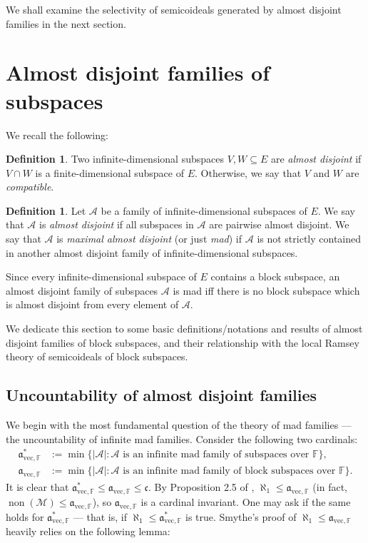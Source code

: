 \documentclass[10pt,a4paper]{amsart}
\theoremstyle{plain}
\numberwithin{equation}{section}
\theoremstyle{definition}
\newtheorem{definition}[theorem]{Definition}
\newcommand{\func}{\operatorname}
\newcommand{\cal}{\mathcal}
\renewcommand{\frak}{\mathfrak}
\newcommand{\A}{\cal{A}}
\newcommand{\non}{\func{non}}
\newcommand{\M}{\mathcal{M}}
\newcommand{\avec}{\frak{a}_{\mathrm{vec},\mathbb{F}}}
\begin{document}
We shall examine the selectivity of semicoideals generated by almost disjoint families in the next section.

\section{Almost disjoint families of subspaces}
\label{sec:ad.families}
We recall the following:
\begin{definition}
    Two infinite-dimensional subspaces $V,W \subseteq E$ are \emph{almost disjoint} if $V \cap W$ is a finite-dimensional subspace of $E$. Otherwise, we say that $V$ and $W$ are \emph{compatible}.
\end{definition}

\begin{definition}    
    Let $\A$ be a family of infinite-dimensional subspaces of $E$. We say that $\A$ is \emph{almost disjoint} if all subspaces in $\A$ are pairwise almost disjoint. We say that $\A$ is \emph{maximal almost disjoint} (or just \emph{mad}) if $\A$ is not strictly contained in another almost disjoint family of infinite-dimensional subspaces.
\end{definition}

Since every infinite-dimensional subspace of $E$ contains a block subspace, an almost disjoint family of subspaces $\A$ is mad iff there is no block subspace which is almost disjoint from every element of $\A$.

We dedicate this section to some basic definitions/notations and results of almost disjoint families of block subspaces, and their relationship with the local Ramsey theory of semicoideals of block subspaces.

\subsection{Uncountability of almost disjoint families}
We begin with the most fundamental question of the theory of mad families --- the uncountability of infinite mad families. Consider the following two cardinals:
\begin{align*}
    \avec^* &:= \min\{|\A| : \text{$\A$ is an infinite mad family of subspaces over $\mathbb{F}$}\}, \\
    \avec &:= \min\{|\A| : \text{$\A$ is an infinite mad family of block subspaces over $\mathbb{F}$}\}.
\end{align*}
It is clear that $\avec^* \leq \avec \leq \frak{c}$. By Proposition 2.5 of \cite{S19}, $\aleph_1 \leq \avec$ (in fact, $\non(\M) \leq \avec$), so $\avec$ is a cardinal invariant. One may ask if the same holds for $\avec^*$ --- that is, if $\aleph_1 \leq \avec^*$ is true. Smythe's proof of $\aleph_1 \leq \avec$ heavily relies on the following lemma:
\end{document}
